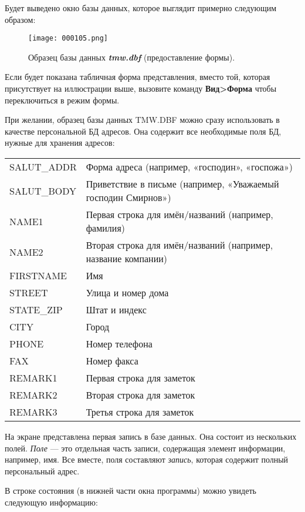 ﻿\documentclass[a4paper,10pt]{article}
\begin{document}
Будет выведено окно базы данных, которое выглядит примерно следующим образом:

\begin{figure}[ht]
\texttt{[image: 000105.png]}
\centering
\caption{Образец базы данных \textbf{\textit{tmw.dbf}} (предоставление формы).}
\end{figure}

Если будет показана табличная форма представления, вместо той, которая присутствует на иллюстрации выше, вызовите команду \textbf{Вид>Форма} чтобы переключиться в режим формы.

При желании, образец базы данных TMW.DBF можно сразу использовать в качестве персональной БД адресов. Она содержит все необходимые поля БД, нужные для хранения адресов:

\begin{center}
\begin{tabular}{  m{4cm}  m{12cm}  }
SALUT\_ADDR  & Форма адреса (например, «господин», «госпожа»)\\ 
 SALUT\_BODY    & Приветствие в  письме (например, «Уважаемый господин Смирнов»)\\
 NAME1   & Первая строка для имён/названий (например, фамилия)\\
 NAME2 & Вторая строка для имён/названий (например, название компании)\\
 FIRSTNAME & Имя\\
 STREET & Улица и номер дома\\
 STATE\_ZIP & Штат и индекс\\
 CITY & Город\\
 PHONE & Номер телефона\\
 FAX & Номер факса\\
 REMARK1 & Первая строка для заметок\\
 REMARK2 & Вторая строка для заметок\\
 REMARK3 & Третья строка для заметок\\
\end{tabular}
\end{center}

На экране представлена первая запись в базе данных. Она состоит из нескольких полей. \textit{Поле} — это отдельная часть записи, содержащая элемент информации, например, имя. Все вместе, поля составляют \textit{запись}, которая содержит полный персональный адрес.

В строке состояния (в нижней части окна программы) можно увидеть следующую информацию:
\end{document}
